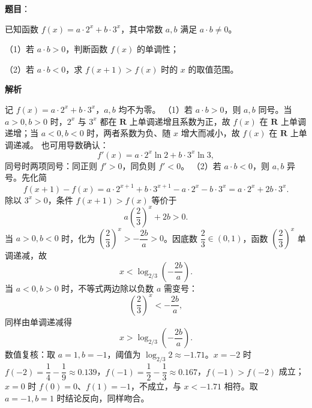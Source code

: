 \begin{answer}

\textbf{题目}：

已知函数 $f(x)=a\cdot 2^x+b\cdot 3^x$，其中常数 $a,b$ 满足 $a\cdot b\neq 0$。

（1）若 $a\cdot b>0$，判断函数 $f(x)$ 的单调性；

（2）若 $a\cdot b<0$，求 $f(x+1)>f(x)$ 时的 $x$ 的取值范围。

\textbf{解析}

记 $f(x)=a\cdot2^x+b\cdot3^x$，$a,b$ 均不为零。
（1）若 $a\cdot b>0$，则 $a,b$ 同号。当 $a>0,b>0$ 时，$2^x$ 与 $3^x$ 都在 $\mathbf R$ 上单调递增且系数为正，故 $f(x)$ 在 $\mathbf R$ 上单调递增；当 $a<0,b<0$ 时，两者系数为负、随 $x$ 增大而减小，故 $f(x)$ 在 $\mathbf R$ 上单调递减。
也可用导数确认：
\nopagebreak[4]
\[f'(x)=a\cdot2^x\ln2+b\cdot3^x\ln3,\]
同号时两项同号：同正则 $f'>0$，同负则 $f'<0$。
（2）若 $a\cdot b<0$，则 $a,b$ 异号。先化简
\nopagebreak[4]
\[f(x+1)-f(x)=a\cdot2^{x+1}+b\cdot3^{x+1}-a\cdot2^x-b\cdot3^x=a\cdot2^x+2b\cdot3^x.\]
除以 $3^x>0$，条件 $f(x+1)>f(x)$ 等价于
\nopagebreak[4]
\[a\left(\frac23\right)^x+2b>0.\]
当 $a>0,b<0$ 时，化为 $\left(\dfrac23\right)^x>-\dfrac{2b}{a}>0$。因底数 $\dfrac23\in(0,1)$，函数 $\left(\dfrac23\right)^x$ 单调递减，故
\nopagebreak[4]
\[x<\log_{2/3}\left(-\frac{2b}{a}\right).\]
当 $a<0,b>0$ 时，不等式两边除以负数 $a$ 需变号：
\nopagebreak[4]
\[\left(\frac23\right)^x<-\frac{2b}{a},\]
同样由单调递减得
\nopagebreak[4]
\[x>\log_{2/3}\left(-\frac{2b}{a}\right).\]
数值复核：取 $a=1,b=-1$，阈值为 $\log_{2/3}2\approx-1.71$。$x=-2$ 时 $f(-2)=\dfrac14-\dfrac19\approx0.139$，$f(-1)=\dfrac12-\dfrac13\approx0.167$，$f(-1)>f(-2)$ 成立；$x=0$ 时 $f(0)=0$、$f(1)=-1$，不成立，与 $x<-1.71$ 相符。取 $a=-1,b=1$ 时结论反向，同样吻合。


\end{answer}

